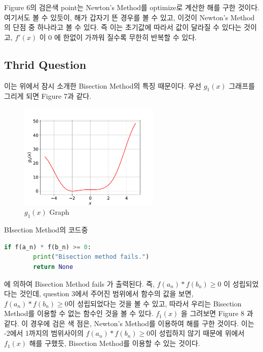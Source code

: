 \documentclass[11pt]{article}
\begin{document}
\noindent  
Figure 6의 검은색 point는 Newton's Method를 optimize로 계산한 해를 구한 것이다. 여기서도 볼 수 있듯이,  해가 갑자기 뜬 경우를 볼 수 있고, 이것이 Newton's Method의 단점 중 하나라고 볼 수 있다. 즉 이는 초기값에 따라서 값이 달라질 수 있다는 것이고, $f'(x)$ 이 0 에 한없이 가까워 질수록 무한히 반복할 수 있다.
\clearpage










\subsection{Thrid Question} 
이는 위에서 잠시 소개한 Bisection Method의 특징 때문이다. 우선 $g_1(x)$ 그래프를 그리게 되면 Figure 7과 같다. 
\begin{figure}[!ht]
  \centering
  \includegraphics[width=0.6\textwidth]{Bisectoin_Question2.pdf}
  \caption{$g_1(x)$ Graph}
\end{figure}

\noindent  
BIsection Method의 코드중 
\begin{lstlisting}[language=Python]
    if f(a_n) * f(b_n) >= 0:
        print("Bisection method fails.")
        return None
\end{lstlisting}
에 의하여 Bisection Method fails 가 출력된다. 즉, $f(a_n) * f(b_n) \geq 0$ 이 성립되었다는 것인데, question 3에서 주어진 범위에서 함수의 값을 보면, $ f(a_n) * f(b_n) \geq 0$이 성립되었다는 것을 볼 수 있고, 따라서 우리는 Bisection Method를 이용할 수 없는 함수인 것을 볼 수 있다. $f_1(x)$ 을 그려보면 Figure 8 과 같다. 이 경우에 검은 색 점은, Newton's Method를 이용하여 해를 구한 것이다. 이는 -2에서 1까지의 범위사이의 $ f(a_n) * f(b_n) \geq 0$이 성립하지 않기 때문에 위에서 $f_1(x)$ 해를 구했듯, Bisection Method를 이용할 수 있는 것이다.
\end{document}
